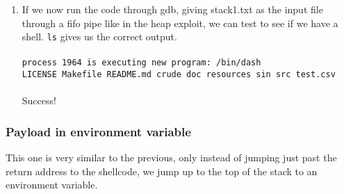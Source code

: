 \documentclass[]{article}
\begin{document}
\begin{enumerate}
	\\
	\\
	\item If we now run the code through gdb, giving stack1.txt as the input file through a fifo pipe like in the heap exploit, we can test to see if we have a shell. \texttt{ls} gives us the correct output.
	\\\\
	\texttt{process 1964 is executing new program: /bin/dash\\
		LICENSE  Makefile  README.md  crude  doc  resources  sin  src  test.csv}
	\\\\
	Success!
\end{enumerate}
\subsubsection*{Payload in environment variable}
This one is very similar to the previous, only instead of jumping just past the return address to the shellcode, we jump up to the top of the stack to an environment variable.
\end{document}
